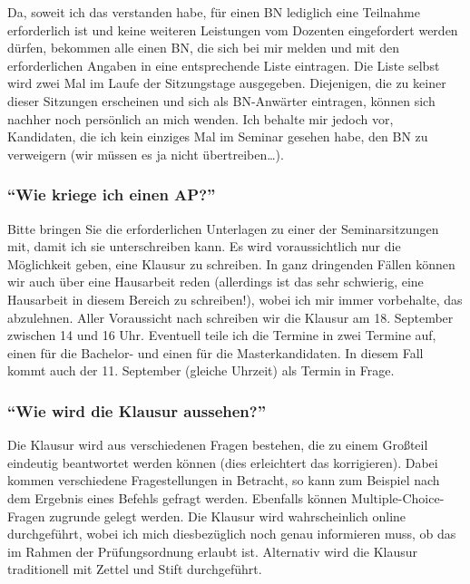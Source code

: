 Da, soweit ich das verstanden habe, für einen BN lediglich eine
Teilnahme erforderlich ist und keine weiteren Leistungen vom Dozenten
eingefordert werden dürfen, bekommen alle einen BN, die sich bei mir
melden und mit den erforderlichen Angaben in eine entsprechende Liste
eintragen. Die Liste selbst wird zwei Mal im Laufe der Sitzungstage
ausgegeben. Diejenigen, die zu keiner dieser Sitzungen erscheinen und
sich als BN-Anwärter eintragen, können sich nachher noch persönlich an
mich wenden. Ich behalte mir jedoch vor, Kandidaten, die ich kein
einziges Mal im Seminar gesehen habe, den BN zu verweigern (wir müssen
es ja nicht übertreiben\ldots{}).


\subsubsection{\texorpdfstring{{``Wie kriege ich einen
AP?''}}{Wie kriege ich einen AP?}}

Bitte bringen Sie die erforderlichen Unterlagen zu einer der
Seminarsitzungen mit, damit ich sie unterschreiben kann. Es wird
voraussichtlich nur die Möglichkeit geben, eine Klausur zu schreiben. In
ganz dringenden Fällen können wir auch über eine Hausarbeit reden
(allerdings ist das sehr schwierig, eine Hausarbeit in diesem Bereich zu
schreiben!), wobei ich mir immer vorbehalte, das abzulehnen. Aller
Voraussicht nach schreiben wir die Klausur am 18. September zwischen 14
und 16 Uhr. Eventuell teile ich die Termine in zwei Termine auf, einen
für die Bachelor- und einen für die Masterkandidaten. In diesem Fall
kommt auch der 11. September (gleiche Uhrzeit) als Termin in Frage.


\subsubsection{\texorpdfstring{{``Wie wird die Klausur
aussehen?''}}{Wie wird die Klausur aussehen?}}

Die Klausur wird aus verschiedenen Fragen bestehen, die zu einem
Großteil eindeutig beantwortet werden können (dies erleichtert das
korrigieren). Dabei kommen verschiedene Fragestellungen in Betracht, so
kann zum Beispiel nach dem Ergebnis eines Befehls gefragt werden.
Ebenfalls können Multiple-Choice-Fragen zugrunde gelegt werden. Die
Klausur wird wahrscheinlich online durchgeführt, wobei ich mich
diesbezüglich noch genau informieren muss, ob das im Rahmen der
Prüfungsordnung erlaubt ist. Alternativ wird die Klausur traditionell
mit Zettel und Stift durchgeführt.


